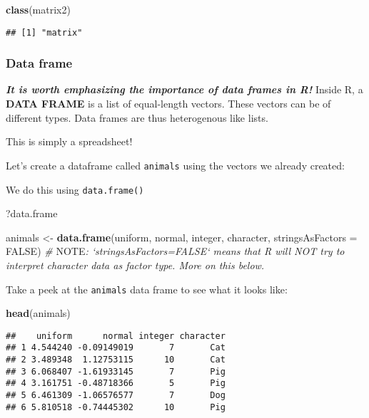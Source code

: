 \documentclass[]{article}
\newenvironment{Shaded}{\begin{snugshade}}{\end{snugshade}}
\newcommand{\KeywordTok}[1]{\textcolor[rgb]{0.13,0.29,0.53}{\textbf{#1}}}
\newcommand{\DataTypeTok}[1]{\textcolor[rgb]{0.13,0.29,0.53}{#1}}
\newcommand{\StringTok}[1]{\textcolor[rgb]{0.31,0.60,0.02}{#1}}
\newcommand{\CommentTok}[1]{\textcolor[rgb]{0.56,0.35,0.01}{\textit{#1}}}
\newcommand{\OtherTok}[1]{\textcolor[rgb]{0.56,0.35,0.01}{#1}}
\newcommand{\AlertTok}[1]{\textcolor[rgb]{0.94,0.16,0.16}{#1}}
\newcommand{\NormalTok}[1]{#1}
\begin{document}
\begin{Shaded}
\begin{Highlighting}[]
\KeywordTok{class}\NormalTok{(matrix2)}
\end{Highlighting}
\end{Shaded}

\begin{verbatim}
## [1] "matrix"
\end{verbatim}

\subsubsection{Data frame}\label{data-frame}

\emph{\textbf{It is worth emphasizing the importance of data frames in
R!}} Inside R, a \textbf{DATA FRAME} is a list of equal-length vectors.
These vectors can be of different types. Data frames are thus
heterogenous like lists.

This is simply a spreadsheet!

Let's create a dataframe called \texttt{animals} using the vectors we
already created:

We do this using \texttt{data.frame()}

\begin{Shaded}
\begin{Highlighting}[]
\NormalTok{?data.frame}
\end{Highlighting}
\end{Shaded}

\begin{Shaded}
\begin{Highlighting}[]
\NormalTok{animals <-}\StringTok{ }\KeywordTok{data.frame}\NormalTok{(uniform, normal, integer, character, }\DataTypeTok{stringsAsFactors =} \OtherTok{FALSE}\NormalTok{)}
\CommentTok{# }\AlertTok{NOTE}\CommentTok{: `stringsAsFactors=FALSE` means that R will NOT try to interpret character data as factor type. More on this below. }
\end{Highlighting}
\end{Shaded}

Take a peek at the \texttt{animals} data frame to see what it looks
like:

\begin{Shaded}
\begin{Highlighting}[]
\KeywordTok{head}\NormalTok{(animals)}
\end{Highlighting}
\end{Shaded}

\begin{verbatim}
##    uniform      normal integer character
## 1 4.544240 -0.09149019       7       Cat
## 2 3.489348  1.12753115      10       Cat
## 3 6.068407 -1.61933145       7       Pig
## 4 3.161751 -0.48718366       5       Pig
## 5 6.461309 -1.06576577       7       Dog
## 6 5.810518 -0.74445302      10       Pig
\end{verbatim}
\end{document}
